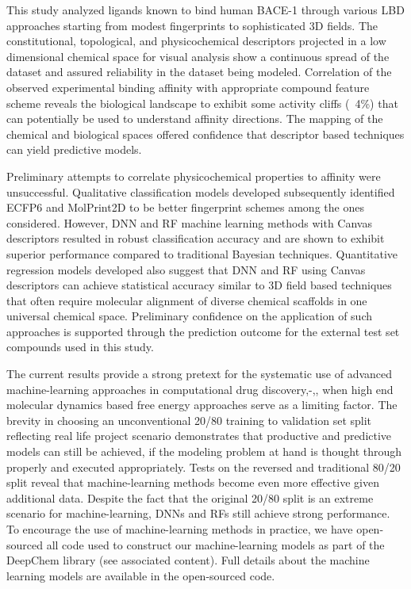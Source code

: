 This study analyzed ligands known to bind human BACE-1 through various LBD approaches starting from modest fingerprints to sophisticated 3D fields.  The constitutional, topological, and physicochemical descriptors projected in a low dimensional chemical space for visual analysis show a continuous spread of the dataset and assured reliability in the dataset being modeled.  Correlation of the observed experimental binding affinity with appropriate compound feature scheme reveals the biological landscape to exhibit some activity cliffs (~4\%) that can potentially be used to understand affinity directions.  The mapping of the chemical and biological spaces offered confidence that descriptor based techniques can yield predictive models.  

Preliminary attempts to correlate physicochemical properties to affinity were unsuccessful.  Qualitative classification models developed subsequently identified ECFP6 and MolPrint2D to be better fingerprint schemes among the ones considered.  However, DNN and RF machine learning methods with Canvas descriptors resulted in robust classification accuracy and are shown to exhibit superior performance compared to traditional Bayesian techniques. Quantitative regression models developed also suggest that DNN and RF using Canvas descriptors can achieve statistical accuracy similar to 3D field based techniques that often require molecular alignment of diverse chemical scaffolds in one universal chemical space.  Preliminary confidence on the application of such approaches is supported through the prediction outcome for the external test set compounds used in this study.  

The current results provide a strong pretext for the systematic use of advanced machine-learning approaches in computational drug discovery,-,, when high end molecular dynamics based free energy approaches serve as a limiting factor.  The brevity in choosing an unconventional 20/80 training to validation set split reflecting real life project scenario demonstrates that productive and predictive models can still be achieved, if the modeling problem at hand is thought through properly and executed appropriately.  
Tests on the reversed and traditional 80/20 split reveal that machine-learning methods become even more effective given additional data. Despite the fact that the original 20/80 split is an extreme scenario for machine-learning, DNNs and RFs still achieve strong performance. To encourage the use of machine-learning methods in practice, we have open-sourced all code used to construct our machine-learning models as part of the DeepChem library (see associated content).  Full details about the machine learning models are available in the open-sourced code.

